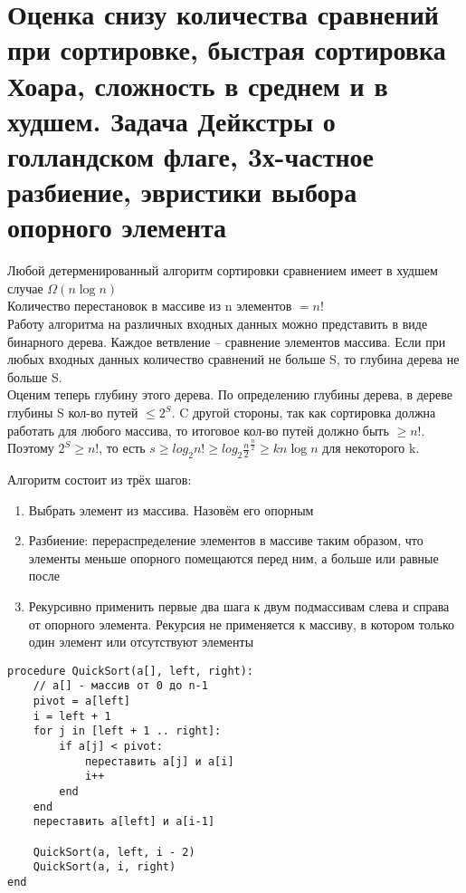 \section {Оценка снизу количества сравнений при сортировке, быстрая сортировка Хоара, сложность в среднем и в худшем. Задача Дейкстры о голландском флаге, 3х-частное разбиение, эвристики выбора опорного элемента} 

 Любой детерменированный алгоритм сортировки сравнением имеет в худшем случае $\Omega (n \log n)$ \\

\noindent Количество перестановок в массиве из n элементов $= n!$ \\
Работу алгоритма на различных входных данных можно
представить в виде бинарного дерева. Каждое ветвление –
сравнение элементов массива. Если при любых входных данных
количество сравнений не больше S, то глубина дерева не больше
S.\\

\noindent Оценим теперь глубину этого дерева. По определению глубины дерева, в дереве глубины S кол-во путей $\le 2^S$. C другой стороны, так как сортировка должна работать для любого массива, то итоговое кол-во путей должно быть $\ge n!$. Поэтому $2^S \ge n!$, то есть $s \ge log_2 n! \ge log_2 \frac{n}{2}^{\frac{n}{2}} \ge k n \log n$ для некоторого k. \\


\noindent Алгоритм состоит из трёх шагов:
\begin{enumerate}
    \item Выбрать элемент из массива. Назовём его опорным
    \item Разбиение: перераспределение элементов в массиве таким образом, что элементы меньше опорного помещаются перед ним, а больше или равные после
    \item Рекурсивно применить первые два шага к двум подмассивам слева и справа от опорного элемента. Рекурсия не применяется к массиву, в котором только один элемент или отсутствуют элементы
\end{enumerate}

\begin{verbatim}
procedure QuickSort(a[], left, right):
    // a[] - массив от 0 до n-1
    pivot = a[left]
    i = left + 1
    for j in [left + 1 .. right]:
        if a[j] < pivot:
            переставить a[j] и a[i]
            i++
        end
    end
    переставить a[left] и a[i-1]
    
    QuickSort(a, left, i - 2)
    QuickSort(a, i, right)
end
\end{verbatim} \\

